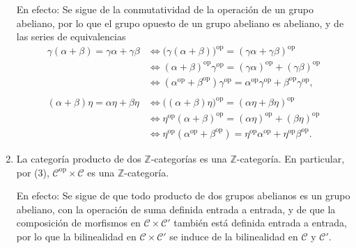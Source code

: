 \documentclass[tesis]{subfiles}
\begin{document}
\begin{Obs}
\begin{enumerate}[label=(\arabic*)]
            En efecto: Se sigue de la conmutatividad de la operación de un grupo abeliano, por lo que el grupo opuesto de un grupo abeliano es abeliano, y de las series de equivalencias
            \begin{align*}
                \gamma(\alpha+\beta) = \gamma\alpha+\gamma\beta &\iff \big(\gamma(\alpha+\beta)\big)^\text{op}  = (\gamma\alpha+\gamma\beta)^\text{op} \\
                                                                &\iff (\alpha+\beta)^\text{op}\gamma^\text{op} = (\gamma\alpha)^\text{op} + (\gamma\beta)^\text{op} \\
                                                                &\iff (\alpha^\text{op}+\beta^\text{op})\gamma^\text{op} = \alpha^\text{op}\gamma^\text{op} + \beta^\text{op}\gamma^\text{op}, \\ \\
                (\alpha+\beta)\eta = \alpha\eta + \beta\eta &\iff \big((\alpha+\beta)\eta\big)^\text{op} = (\alpha\eta + \beta\eta)^\text{op} \\
                                                            &\iff \eta^\text{op}(\alpha+\beta)^\text{op} = (\alpha\eta)^\text{op} + (\beta\eta)^\text{op} \\
                                                            &\iff \eta^\text{op}(\alpha^\text{op}+\beta^\text{op}) = \eta^\text{op}\alpha^\text{op} + \eta^\text{op}\beta^\text{op}.
            \end{align*}
        
        \item La categoría producto de dos $\mathbb{Z}$-categorías es una $\mathbb{Z}$-categoría. En particular, por (3), $\mathscr{C}^\text{op}\times\mathscr{C}$ es una $\mathbb{Z}$-categoría.

            En efecto: Se sigue de que todo producto de dos grupos abelianos es un grupo abeliano, con la operación de suma definida entrada a entrada, y de que la composición de morfismos en $\mathscr{C}\times\mathscr{C}'$ también está definida entrada a entrada, por lo que la bilinealidad en $\mathscr{C}\times\mathscr{C}'$ se induce de la bilinealidad en $\mathscr{C}$ y $\mathscr{C}'$.
    \end{enumerate}
\end{Obs}
\end{document}
